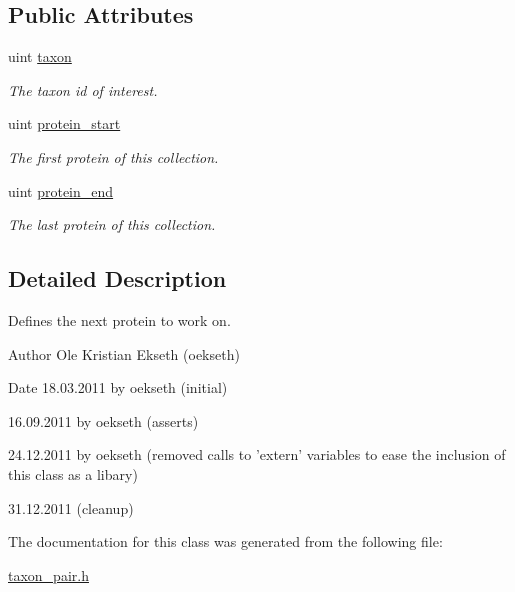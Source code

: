 \subsection*{Public Attributes}
\begin{DoxyCompactItemize}
\item 
\hypertarget{classtaxon__pair_acbb48470453cdc7a35f1db57a289c5df}{
uint \hyperlink{classtaxon__pair_acbb48470453cdc7a35f1db57a289c5df}{taxon}}
\label{classtaxon__pair_acbb48470453cdc7a35f1db57a289c5df}

\begin{DoxyCompactList}\small\item\em The taxon id of interest. \end{DoxyCompactList}\item 
\hypertarget{classtaxon__pair_ab0d911000e22ca615d0aa9ffa6b40f64}{
uint \hyperlink{classtaxon__pair_ab0d911000e22ca615d0aa9ffa6b40f64}{protein\_\-start}}
\label{classtaxon__pair_ab0d911000e22ca615d0aa9ffa6b40f64}

\begin{DoxyCompactList}\small\item\em The first protein of this collection. \end{DoxyCompactList}\item 
\hypertarget{classtaxon__pair_a1c7620b427f178801f1129286b27c1bc}{
uint \hyperlink{classtaxon__pair_a1c7620b427f178801f1129286b27c1bc}{protein\_\-end}}
\label{classtaxon__pair_a1c7620b427f178801f1129286b27c1bc}

\begin{DoxyCompactList}\small\item\em The last protein of this collection. \end{DoxyCompactList}\end{DoxyCompactItemize}


\subsection{Detailed Description}
Defines the next protein to work on. 

\begin{DoxyAuthor}{Author}
Ole Kristian Ekseth (oekseth) 
\end{DoxyAuthor}
\begin{DoxyDate}{Date}
18.03.2011 by oekseth (initial) 

16.09.2011 by oekseth (asserts) 

24.12.2011 by oekseth (removed calls to 'extern' variables to ease the inclusion of this class as a libary) 

31.12.2011 (cleanup) 
\end{DoxyDate}


The documentation for this class was generated from the following file:\begin{DoxyCompactItemize}
\item 
\hyperlink{taxon__pair_8h}{taxon\_\-pair.h}\end{DoxyCompactItemize}
